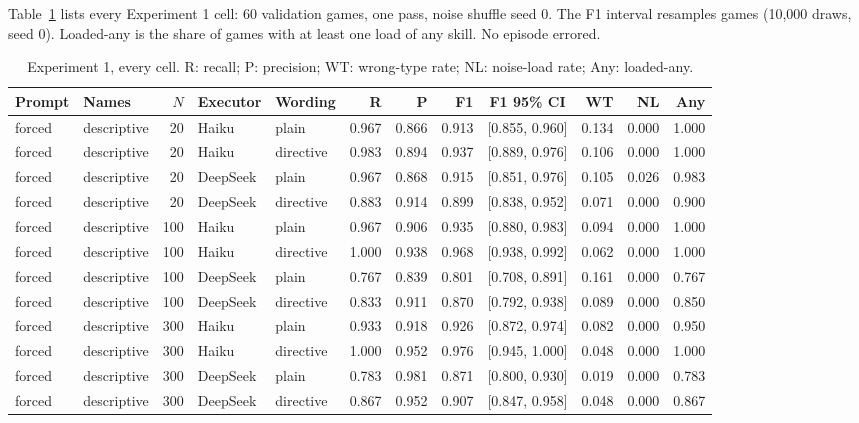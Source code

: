 \documentclass[11pt]{article}
\begin{document}
Table~\ref{tab:exp1} lists every Experiment 1 cell: 60 validation games, one pass, noise shuffle seed 0. The F1 interval resamples games (10,000 draws, seed 0). Loaded-any is the share of games with at least one load of any skill. No episode errored.

\begin{table}[!h]
\centering
\caption{Experiment 1, every cell. R: recall; P: precision; WT: wrong-type rate; NL: noise-load rate; Any: loaded-any.}
\label{tab:exp1}
\small
\setlength{\tabcolsep}{3.5pt}
\begin{tabular}{llrllrrrcrrr}
\toprule
Prompt & Names & $N$ & Executor & Wording & R & P & F1 & F1 95\% CI & WT & NL & Any \\
\midrule
forced & descriptive & 20 & Haiku & plain & 0.967 & 0.866 & 0.913 & [0.855, 0.960] & 0.134 & 0.000 & 1.000 \\
forced & descriptive & 20 & Haiku & directive & 0.983 & 0.894 & 0.937 & [0.889, 0.976] & 0.106 & 0.000 & 1.000 \\
forced & descriptive & 20 & DeepSeek & plain & 0.967 & 0.868 & 0.915 & [0.851, 0.976] & 0.105 & 0.026 & 0.983 \\
forced & descriptive & 20 & DeepSeek & directive & 0.883 & 0.914 & 0.899 & [0.838, 0.952] & 0.071 & 0.000 & 0.900 \\
forced & descriptive & 100 & Haiku & plain & 0.967 & 0.906 & 0.935 & [0.880, 0.983] & 0.094 & 0.000 & 1.000 \\
forced & descriptive & 100 & Haiku & directive & 1.000 & 0.938 & 0.968 & [0.938, 0.992] & 0.062 & 0.000 & 1.000 \\
forced & descriptive & 100 & DeepSeek & plain & 0.767 & 0.839 & 0.801 & [0.708, 0.891] & 0.161 & 0.000 & 0.767 \\
forced & descriptive & 100 & DeepSeek & directive & 0.833 & 0.911 & 0.870 & [0.792, 0.938] & 0.089 & 0.000 & 0.850 \\
forced & descriptive & 300 & Haiku & plain & 0.933 & 0.918 & 0.926 & [0.872, 0.974] & 0.082 & 0.000 & 0.950 \\
forced & descriptive & 300 & Haiku & directive & 1.000 & 0.952 & 0.976 & [0.945, 1.000] & 0.048 & 0.000 & 1.000 \\
forced & descriptive & 300 & DeepSeek & plain & 0.783 & 0.981 & 0.871 & [0.800, 0.930] & 0.019 & 0.000 & 0.783 \\
forced & descriptive & 300 & DeepSeek & directive & 0.867 & 0.952 & 0.907 & [0.847, 0.958] & 0.048 & 0.000 & 0.867 \\

\end{tabular}
\end{table}
\end{document}
